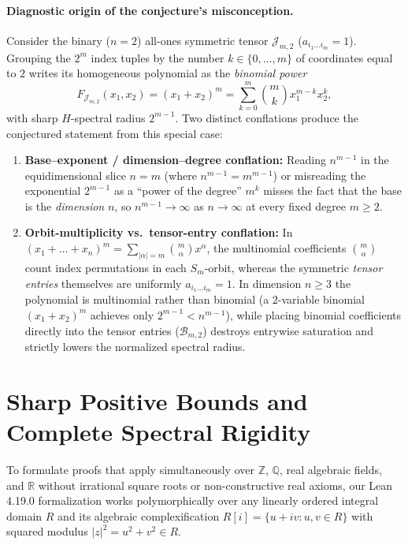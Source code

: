 \documentclass[11pt]{article}
\theoremstyle{definition}
\newcommand{\R}{\mathbb{R}}
\newcommand{\Q}{\mathbb{Q}}
\newcommand{\Z}{\mathbb{Z}}
\newcommand{\cB}{\mathcal{B}}
\newcommand{\cJ}{\mathcal{J}}
\begin{document}
\paragraph{Diagnostic origin of the conjecture's misconception.}
Consider the binary ($n = 2$) all-ones symmetric tensor $\cJ_{m,2}$ ($a_{i_1 \dots i_m} = 1$).
Grouping the $2^m$ index tuples by the number $k \in \{0, \dots, m\}$ of coordinates equal to $2$
writes its homogeneous polynomial as the \emph{binomial power}
\[
  F_{\cJ_{m,2}}(x_1, x_2) = (x_1 + x_2)^m = \sum_{k=0}^m \binom{m}{k} x_1^{m-k} x_2^k,
\]
with sharp $H$-spectral radius $2^{m-1}$. Two distinct conflations produce the conjectured
statement from this special case:
\begin{enumerate}
  \item \textbf{Base--exponent / dimension--degree conflation:} Reading $n^{m-1}$ in the
  equidimensional slice $n = m$ (where $n^{m-1} = m^{m-1}$) or misreading the exponential
  $2^{m-1}$ as a ``power of the degree'' $m^k$ misses the fact that the base is the
  \emph{dimension} $n$, so $n^{m-1} \to \infty$ as $n \to \infty$ at every fixed degree $m \ge 2$.
  \item \textbf{Orbit-multiplicity vs.\ tensor-entry conflation:} In $(x_1 + \dots + x_n)^m =
  \sum_{|\alpha|=m} \binom{m}{\alpha} x^\alpha$, the multinomial coefficients $\binom{m}{\alpha}$
  count index permutations in each $S_m$-orbit, whereas the symmetric \emph{tensor entries}
  themselves are uniformly $a_{i_1 \dots i_m} = 1$. In dimension $n \ge 3$ the polynomial is
  multinomial rather than binomial (a $2$-variable binomial $(x_1 + x_2)^m$ achieves only
  $2^{m-1} < n^{m-1}$), while placing binomial coefficients directly into the tensor entries
  ($\cB_{m,2}$) destroys entrywise saturation and strictly lowers the normalized spectral radius.
\end{enumerate}

\section{Sharp Positive Bounds and Complete Spectral Rigidity}

To formulate proofs that apply simultaneously over $\Z$, $\Q$, real algebraic fields, and $\R$
without irrational square roots or non-constructive real axioms, our Lean 4.19.0 formalization
works polymorphically over any linearly ordered integral domain $R$ and its algebraic
complexification $R[i] = \{u + i v : u, v \in R\}$ with squared modulus $|z|^2 = u^2 + v^2 \in R$.
\end{document}
